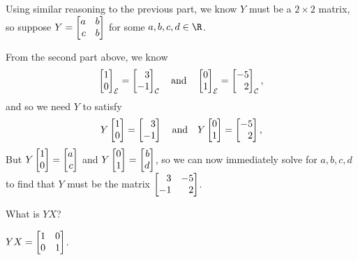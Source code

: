 \begin{parts}
\begin{solution}
				Using similar reasoning to the previous part, we know $Y$ must be
				a $2\times2$ matrix, so suppose $Y=\mat{a&b\\c&b}$ for some
				$a,b,c,d\in\R$.

				From the second part above, we know
				\[
					\mat{1\\0}_{\mathcal E} = \mat{3\\-1}_{\mathcal C}
					\quad \text{and} \quad
					\mat{0\\1}_{\mathcal E} = \mat{-5\\2}_{\mathcal C},
				\]
				and so we need $Y$ to satisfy
				\[
					Y\mat{1\\0}=\mat{3\\-1}
					\quad \text{and} \quad
					Y\mat{0\\1}=\mat{-5\\2},
				\]
				But $Y\mat{1\\0}=\mat{a\\c}$ and $Y\mat{0\\1}=\mat{b\\d}$, so we
				can now immediately solve for $a,b,c,d$ to find that $Y$ must be
				the matrix $\mat{3&-5\\-1&2}$.
			\end{solution}
		\item What is $YX$?
			\begin{solution}
				$YX = \mat{1&0\\0&1}$.
			\end{solution}
	\end{parts}

